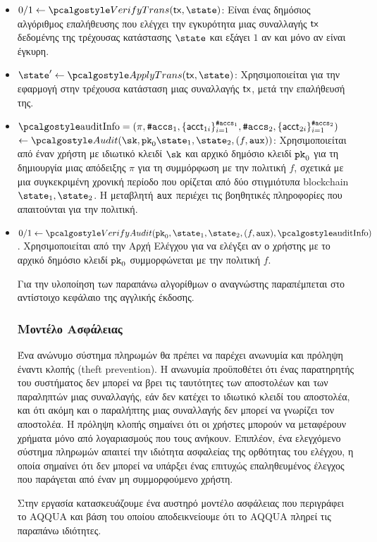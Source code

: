 \begin{itemize}
    \item $0/1 \gets \vertxn(\txn, \state)$: 
    Είναι ένας δημόσιος αλγόριθμος επαλήθευσης που ελέγχει την εγκυρότητα μιας συναλλαγής $\textup{\textsf{tx}}$ δεδομένης της τρέχουσας κατάστασης $\state$ και εξάγει $1$ αν και μόνο αν είναι έγκυρη. 
    
    \item $\state' \gets \applytxn (\txn, \state)$:
    Χρησιμοποιείται για την εφαρμογή στην τρέχουσα κατάσταση μιας συναλλαγής $\textup{\textsf{tx}}$, μετά την επαλήθευσή της.
    
    \item $\auditinfo = (\pi, {\numaccs}_1, \{ \acct_{1i} \}_{i=1}^{\numaccs_1}, {\numaccs}_2, \{ \acct_{2i} \}_{i=1}^{\numaccs_2}) $ \\$\gets \audit(\sk,\inpk \snap_{1}, \snap_{2}, (f, \aux))$: 
    Χρησιμοποιείται από έναν χρήστη με ιδιωτικό κλειδί $\sk$ και αρχικό δημόσιο κλειδί $\textup{\texttt{pk}}_{0}$ για τη δημιουργία μιας απόδειξης $\pi$ για τη συμμόρφωση με την πολιτική $f$, σχετικά με μια συγκεκριμένη χρονική περίοδο που ορίζεται από δύο στιγμιότυπα blockchain $\snap_1, \snap_2$. 
    Η μεταβλητή ${\textup{\texttt{aux}}}$ περιέχει τις βοηθητικές πληροφορίες που απαιτούνται για την πολιτική. 
    
    \item $0/1 \gets \vera(\inpk, \snap_1, \snap_2, (f,\aux), \auditinfo)$. 
    Χρησιμοποιείται από την Αρχή Ελέγχου για να ελέγξει αν ο χρήστης με το αρχικό δημόσιο κλειδί $\textup{\texttt{pk}}_{0}$ συμμορφώνεται με την πολιτική $f$.

    Για την υλοποίηση των παραπάνω αλγορίθμων ο αναγνώστης παραπέμπεται στο αντίστοιχο κεφάλαιο της αγγλικής έκδοσης.

    \subsubsection{Μοντέλο Ασφάλειας}
    Ένα ανώνυμο σύστημα πληρωμών θα πρέπει να παρέχει ανωνυμία και πρόληψη έναντι κλοπής (theft prevention).
    Η ανωνυμία προϋποθέτει ότι ένας παρατηρητής του συστήματος δεν μπορεί να βρει τις ταυτότητες των αποστολέων και των παραληπτών μιας συναλλαγής, εάν δεν κατέχει το ιδιωτικό κλειδί του αποστολέα, και ότι ακόμη και ο παραλήπτης μιας συναλλαγής δεν μπορεί να γνωρίζει τον αποστολέα. Η πρόληψη κλοπής σημαίνει ότι οι χρήστες μπορούν να μεταφέρουν χρήματα μόνο από λογαριασμούς που τους ανήκουν. Επιπλέον, ένα ελεγχόμενο σύστημα πληρωμών απαιτεί την ιδιότητα ασφαλείας της ορθότητας του ελέγχου, η οποία σημαίνει ότι δεν μπορεί να υπάρξει ένας επιτυχώς επαληθευμένος έλεγχος που παράγεται από έναν μη συμμορφούμενο χρήστη.

    Στην εργασία κατασκευάζουμε ένα αυστηρό μοντέλο ασφάλειας που περιγράφει το AQQUA και βάση του οποίου αποδεικνείουμε ότι το AQQUA πληρεί τις παραπάνω ιδιότητες.


\end{itemize}

